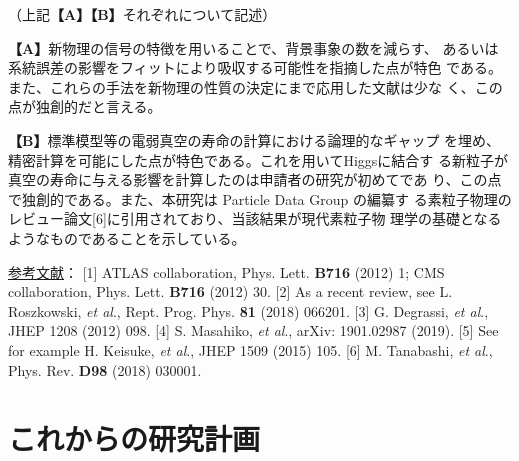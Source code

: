 \documentclass[11pt,a4paper,twoside,dvipdfmx]{jsarticle}   %
\newcommand{\研究課題名}{粒子加速器を用いた電弱相互作用を持つ新物理の探索}
\newcommand{\研究機関名}{東京大学}
\newcommand{\申請者氏名}{千草颯}
\newcommand{\研究代表者氏名}{\申請者氏名}
\newcommand{\研究期間の最終元号年度}{34}	%
\begin{document}
{\vspace*{1mm}

（上記\textbf{【A】【B】}それぞれについて記述）

\vspace*{1mm}

\textbf{【A】}新物理の信号の特徴を用いることで、背景事象の数を減らす、
あるいは系統誤差の影響をフィットにより吸収する可能性を指摘した点が特色
である。また、これらの手法を新物理の性質の決定にまで応用した文献は少な
く、この点が独創的だと言える。

\textbf{【B】}標準模型等の電弱真空の寿命の計算における論理的なギャップ
を埋め、精密計算を可能にした点が特色である。これを用いてHiggsに結合す
る新粒子が真空の寿命に与える影響を計算したのは申請者の研究が初めてであ
り、この点で独創的である。また、本研究は Particle Data Group の編纂す
る素粒子物理のレビュー論文[6]に引用されており、当該結果が現代素粒子物
理学の基礎となるようなものであることを示している。

\vspace*{1mm}
\begin{spacing}{0.8}
 \underline{参考文献}：
 [1] ATLAS collaboration, Phys. Lett. \textbf{B716} (2012) 1;
 CMS collaboration, Phys. Lett. \textbf{B716} (2012) 30.
 [2] As a recent review, see L. Roszkowski, \textit{et al}., Rept. Prog. Phys. \textbf{81} (2018) 066201.
 [3] G. Degrassi, \textit{et al}., JHEP 1208 (2012) 098.
 [4] S. Masahiko, \textit{et al}., arXiv: 1901.02987 (2019).
 [5] See for example H. Keisuke, \textit{et al}., JHEP 1509 (2015) 105.
 [6] M. Tanabashi, \textit{et al}., Phys. Rev. \textbf{D98} (2018) 030001.
\end{spacing}

}

\section{これからの研究計画}
\end{document}
